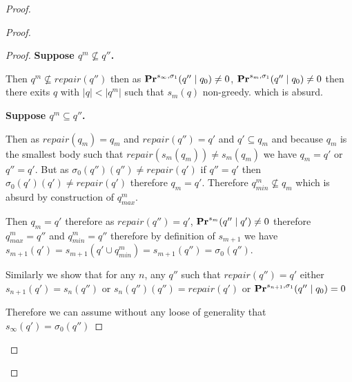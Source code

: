 \begin{proof}
\begin{proof}
\begin{proof}
			\textbf{Suppose $q^m \not \subseteq q''$.}
			
			Then $q^m \not \subseteq repair(q'')$ then as $\mathbf{Pr}^{s_{\infty},\sigma_1}(q'' \mid q_0) \neq 0$, $\mathbf{Pr}^{s_m,\sigma_1}(q'' \mid q_0) \neq 0$ then there exits $q$ with $|q| < |q^m|$ such that $s_m(q)$ non-greedy. which is absurd.
			
			\textbf{Suppose $q^m \subseteq q''$.}
			
			Then as $repair(q_m) = q_m$  and $repair(q'') = q'$ and $q' \subseteq q_m$  and because $q_m$ is the smallest body such that $repair(s_m(q_m)) \neq s_m(q_m)$ we have $q_m = q'$ or $q'' = q'$.  
			But as $\sigma_0(q'')(q'') \neq repair(q')$ if $q'' = q'$ then $\sigma_0(q')(q') \neq repair(q')$ therefore $q_m = q'$.
			Therefore $q^m_{min} \not \subseteq q_m$ which is absurd by construction of $q^m_{max}$.
			
			Then $q_m = q'$ therefore as $repair(q'') = q'$, $\mathbf{Pr}^{s_m}(q''\mid q') \neq 0$ therefore $q^m_{max} = q''$ and $q^m_{min} = q''$ therefore by definition of $s_{m+1}$ we have $s_{m+1}(q') = s_{m+1}(q' \cup q^m_{min}) = s_{m+1}(q'') =  \sigma_{0}(q'')$. 
			
			\bigskip
			Similarly we  show that for any $n$, any $q''$ such that $repair(q'') = q'$ either $s_{n+1}(q') = s_{n}(q'')$ or $s_{n}(q'')(q'') = repair(q')$ or $\mathbf{Pr}^{s_{n+1},\sigma_1}(q'' \mid q_0) = 0$
			
			Therefore we can assume without any loose of generality that $s_{\infty}(q') = \sigma_{0}(q'')$
			
			
			\iffalse
			As $s_{\infty}(q') \neq \sigma_0(q')$ there exits $n$ such that $s_n(q') \neq \sigma_{0}(q')$
			
			Let $n = max \{n \in \mathbf{N} \mid s_{n}(q') \neq \sigma_{0}(q') \}$.
			
			Let $q^n$  the smallest body with $s_n(q^n)$ non-greedy, such a body exists otherwise $s_{n+1} = s_{n} = s_{\infty}$.
			
			$$q^n_{max} = \underset{\subseteq}{min}\{q \in \bQ \mid  \pr^{s_n}(q\mid q^n)\neq 0 \land repair(q) \neq q^n \}$$
			$$q^n_{min} = \underset{\subseteq}{min}\{q \in \bQ \mid  q \subseteq q^n_{max} \land s_n(q) \in repair(q^n_{max}) \}$$
			Then we have by definition $s_{n+1}$ such that for any $q \subseteq q_n$ such that $all-meet(q^n_{max}) \in q$ then $s_{n+1}(q) = s_n(q \cup q^n_{min})$, and $s_{n+1} = s_n$ otherwise.
			
			By definition of $n$ we have $s_n(q') = \sigma_0(q')$ and $s_{n+1}(q') \neq \sigma_0(q')$ therefore we have $q' \subseteq q_n$ and $all-meet(q^n_{max}) \in q'$ and $q^n_{min} \not \subseteq q'$. 
			\fi
			

\end{proof}
\end{proof}
\end{proof}
